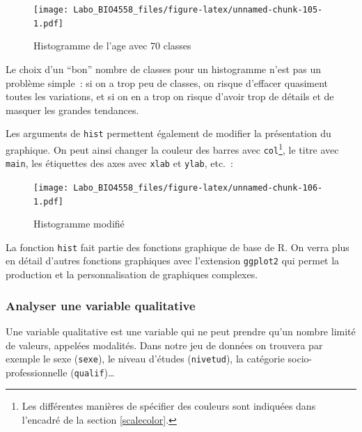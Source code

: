 \documentclass[
  12pt,
]{book}
\newenvironment{Shaded}{\begin{snugshade}}{\end{snugshade}}
\newcommand{\DataTypeTok}[1]{\textcolor[rgb]{0.13,0.29,0.53}{#1}}
\newcommand{\KeywordTok}[1]{\textcolor[rgb]{0.13,0.29,0.53}{\textbf{#1}}}
\newcommand{\NormalTok}[1]{#1}
\newcommand{\OperatorTok}[1]{\textcolor[rgb]{0.81,0.36,0.00}{\textbf{#1}}}
\newcommand{\StringTok}[1]{\textcolor[rgb]{0.31,0.60,0.02}{#1}}
\begin{document}
\begin{figure}
\centering
\texttt{[image: Labo\_BIO4558\_files/figure-latex/unnamed-chunk-105-1.pdf]}
\caption{\label{fig:unnamed-chunk-105}Histogramme de l'age avec 70 classes}
\end{figure}

Le choix d'un ``bon'' nombre de classes pour un histogramme n'est pas un problème simple~: si on a trop peu de classes, on risque d'effacer quasiment toutes les variations, et si on en a trop on risque d'avoir trop de détails et de masquer les grandes tendances.

Les arguments de \texttt{hist} permettent également de modifier la présentation du graphique. On peut ainsi changer la couleur des barres avec \texttt{col}\footnote{Les différentes manières de spécifier des couleurs sont indiquées dans l'encadré de la section \ref{scalecolor}.}, le titre avec \texttt{main}, les étiquettes des axes avec \texttt{xlab} et \texttt{ylab}, etc.~:

\begin{Shaded}
\end{Shaded}

\begin{figure}
\centering
\texttt{[image: Labo\_BIO4558\_files/figure-latex/unnamed-chunk-106-1.pdf]}
\caption{\label{fig:unnamed-chunk-106}Histogramme modifié}
\end{figure}

La fonction \texttt{hist} fait partie des fonctions graphique de base de R. On verra plus en détail d'autres fonctions graphiques
avec l'extension \texttt{ggplot2} qui permet la production et la personnalisation de graphiques complexes.

\hypertarget{analyser-une-variable-qualitative}{%
\subsubsection{Analyser une variable qualitative}\label{analyser-une-variable-qualitative}}

Une variable qualitative est une variable qui ne peut prendre qu'un nombre limité de valeurs, appelées modalités. Dans notre jeu de données on trouvera par exemple le sexe (\texttt{sexe}), le niveau d'études (\texttt{nivetud}), la catégorie socio-professionnelle (\texttt{qualif})\ldots{}
\end{document}
